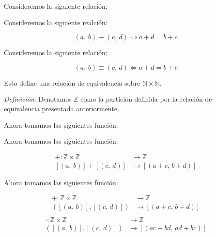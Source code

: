 \documentclass{beamer}
\newcommand{\pair}[2]{(#1,\, #2)}
\begin{document}
  \begin{frame}
    Consideremos la siguiente relación:
  \end{frame}

  \begin{frame}
    Consideremos la siguiente realción:

    \[\pair{a}{b} \equiv \pair{c}{d} \iff a + d = b + c\]
  \end{frame}

  \begin{frame}
    Consideremos la siguiente relación:

    \[\pair{a}{b} \equiv \pair{c}{d} \iff a + d = b + c\]

    Esto define una relación de equivalencia sobre $\mathbb{N} \times \mathbb{N}$.
  \end{frame}

  \begin{frame}
    \textit{Definición}: Denotamos $\mathbb{Z}$ como la partición definida por la 
    relación de equivalencia presentada anteriormente.
  \end{frame}

  \begin{frame}
    Ahora tomamos las siguientes función:
  \end{frame}

  \begin{frame}
    Ahora tomamos las siguientes función:

    \begin{equation*}
      \begin{aligned}
        + : \mathbb{Z} \times \mathbb{Z} &\to \mathbb{Z} \\
        [\pair{a}{b}] + [\pair{c}{d}] &\to [\pair{a+c}{b+d}]
      \end{aligned}
    \end{equation*}
  \end{frame}

  \begin{frame}
    Ahora tomamos las siguientes función:

    \begin{equation*}
      \begin{aligned}
        + : \mathbb{Z} \times \mathbb{Z} &\to \mathbb{Z} \\
        ([\pair{a}{b}], [\pair{c}{d}]) &\to [\pair{a+c}{b+d}] \\
      \end{aligned}
    \end{equation*}
    \newline\newline
    \begin{equation*}
      \begin{aligned}
        \cdot: \mathbb{Z} \times \mathbb{Z} &\to \mathbb{Z} \\
        ([\pair{a}{b}], [\pair{c}{d}]) &\to [\pair{ac + bd}{ad + bc}]
      \end{aligned}
    \end{equation*}
  \end{frame}
\end{document}

